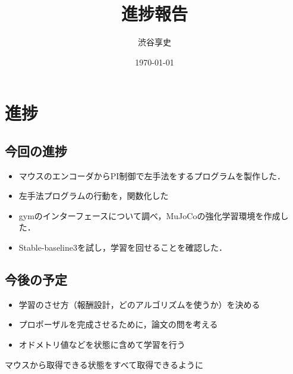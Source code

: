 \documentclass[a4paper,11pt]{jsarticle}
\begin{document}
\title{進捗報告}
\author{渋谷享史}
\date{\today}
\maketitle
\section{進捗}
\subsection{今回の進捗}
\begin{itemize}
  \item マウスのエンコーダからPI制御で左手法をするプログラムを製作した．
  \item 左手法プログラムの行動を，関数化した
  \item gymのインターフェースについて調べ，MuJoCoの強化学習環境を作成した．
  \item Stable-baseline3を試し，学習を回せることを確認した．
\end{itemize}
\subsection{今後の予定}
\begin{itemize}
  \item 学習のさせ方（報酬設計，どのアルゴリズムを使うか）を決める
  \item プロポーザルを完成させるために，論文の問を考える
  \item オドメトリ値などを状態に含めて学習を行う
\end{itemize}
マウスから取得できる状態をすべて取得できるように
\end{document}
